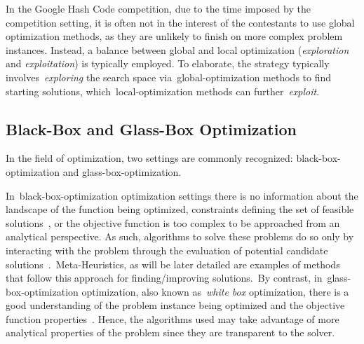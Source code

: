 In the Google Hash Code competition, due to the time imposed by the competition
setting, it is often not in the interest of the contestants to use global
optimization methods, as they are unlikely to finish on more complex problem
instances. Instead, a balance between global and local optimization
(\textit{exploration} and \textit{exploitation}) is typically employed. To
elaborate, the strategy typically involves~\textit{exploring} the search space
via~\acrshort{global-optimization} methods to find~ starting
solutions, which~\acrshort{local-optimization} methods can
further~\textit{exploit}.

\subsection{Black-Box and Glass-Box Optimization}
\label{subsec:bbo-and-gbo}

In the field of optimization, two settings are commonly recognized:
\acrfull{black-box-optimization} and \acrfull{glass-box-optimization}.

In~\acrshort{black-box-optimization} optimization settings there is no
information about the landscape of the function being optimized, constraints
defining the set of feasible solutions~\cite{alarie2021two}, or the objective
function is too complex to be approached from an analytical perspective. As
such, algorithms to solve these problems do so only by interacting with the
problem through the evaluation of potential candidate
solutions~\cite{doerr2020complexity,gutjahr2010stochastic}.~Meta-Heuristics, as
will be later detailed are examples of methods that follow this approach for
finding/improving solutions.~By contrast, in~\acrshort{glass-box-optimization}
optimization, also known as~\textit{white box} optimization, there is a good
understanding of the problem instance being optimized and the objective function
properties~\cite{doerr2020complexity}. Hence, the algorithms used may take
advantage of more analytical properties of the problem since they are
transparent to the solver.


